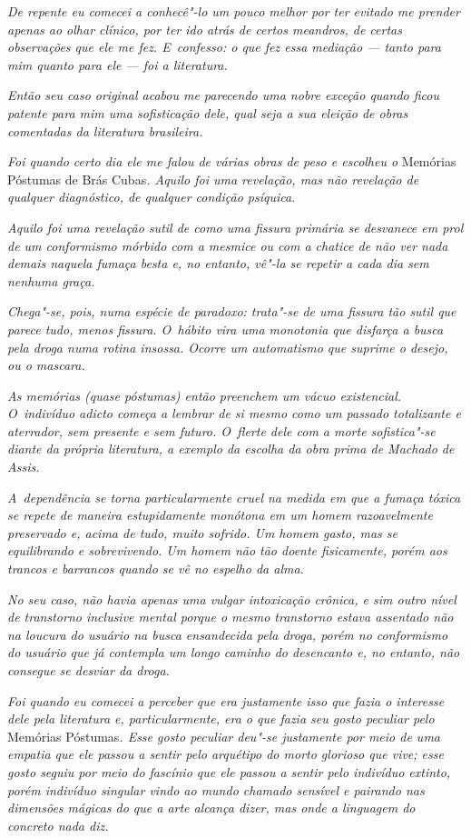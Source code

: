 \emph{De repente eu comecei a conhecê"-lo um pouco melhor por ter evitado
me prender apenas ao olhar clínico, por ter ido atrás de certos
meandros, de certas observações que ele me fez. E~confesso: o que fez
essa mediação --- tanto para mim quanto para ele --- foi a literatura.}

\emph{Então seu caso original acabou me parecendo uma nobre exceção
quando ficou patente para mim uma sofisticação dele, qual seja a sua
eleição de obras comentadas da literatura brasileira.}

\emph{Foi quando certo dia ele me falou de várias obras de peso e
escolheu o} Memórias Póstumas de Brás Cubas\emph{. Aquilo foi uma revelação,
mas não revelação de qualquer diagnóstico, de qualquer condição
psíquica.}

\emph{Aquilo foi uma revelação sutil de como uma fissura primária se
desvanece em prol de um conformismo mórbido com a mesmice ou com a
chatice de não ver nada demais naquela fumaça besta e, no entanto, vê"-la
se repetir a cada dia sem nenhuma graça.}

\emph{Chega"-se, pois, numa espécie de paradoxo: trata"-se de uma fissura
tão sutil que parece tudo, menos fissura. O~hábito vira uma monotonia que
disfarça a busca pela droga numa rotina insossa. Ocorre um automatismo
que suprime o desejo, ou o mascara.}

\emph{As memórias (quase póstumas) então preenchem um vácuo existencial.
O~indivíduo adicto começa a lembrar de si mesmo como um passado
totalizante e aterrador, sem presente e sem futuro. O~flerte dele com a
morte sofistica"-se diante da própria literatura, a exemplo da escolha da
obra prima de Machado de Assis.}

\emph{A~dependência se torna particularmente cruel na medida em que a
fumaça tóxica se repete de maneira estupidamente monótona em um homem
razoavelmente preservado e, acima de tudo, muito sofrido. Um homem
gasto, mas se equilibrando e sobrevivendo. Um homem não tão doente
fisicamente, porém aos trancos e barrancos quando se vê no espelho da
alma.}

\emph{No seu caso, não havia apenas uma vulgar intoxicação crônica, e
sim outro nível de transtorno inclusive mental porque o mesmo transtorno
estava assentado não na loucura do usuário na busca ensandecida pela
droga, porém no conformismo do usuário que já contempla um longo caminho
do desencanto e, no entanto, não consegue se desviar da droga.}

\emph{Foi quando eu comecei a perceber que era justamente isso que fazia
o interesse dele pela literatura e, particularmente, era o que fazia seu
gosto peculiar pelo} Memórias Póstumas\emph{. Esse gosto peculiar deu"-se
justamente por meio de uma empatia que ele passou a sentir pelo
arquétipo do morto glorioso que vive; esse gosto seguiu por meio do
fascínio que ele passou a sentir pelo indivíduo extinto, porém indivíduo
singular vindo ao mundo chamado sensível e pairando nas dimensões
mágicas do que a arte alcança dizer, mas onde a linguagem do concreto
nada diz.}

